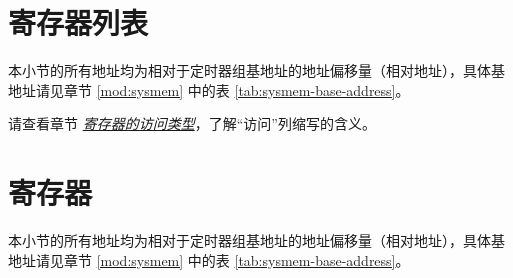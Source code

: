 \documentclass[main\_\_CN.tex]{subfiles}
\begin{document}



\clearpage
\hypertarget{timg-reg-summ}{}
\section{寄存器列表}
\label{sec:timg-reg-summ}

本小节的所有地址均为相对于定时器组基地址的地址偏移量（相对地址），具体基地址请见章节 \ref{mod:sysmem} \textit{} 中的表 \ref{tab:sysmem-base-address}。

请查看章节 \hyperref[glossary-access-types]{\textit{寄存器的访问类型}}，了解“访问”列缩写的含义。





\clearpage
\section{寄存器}

本小节的所有地址均为相对于定时器组基地址的地址偏移量（相对地址），具体基地址请见章节 \ref{mod:sysmem} \textit{} 中的表 \ref{tab:sysmem-base-address}。


\end{document}
